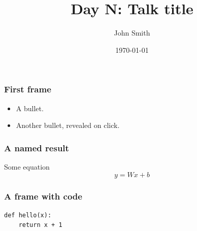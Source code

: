 %
\providecommand{\HANDOUT}{1}




\title[Day N: Talk title]
{Day N: Talk title}

\author[John Smith]
{John Smith}


\date[\today]
{\today}

\frame{\titlepage}

\begin{frame}
\frametitle{First frame}
\begin{itemize}
    \item A bullet.
    \pause
    \item Another bullet, revealed on click.
\end{itemize}
\end{frame}

\begin{frame}
\frametitle{A named result}
\begin{block}{Some equation}
    $$ y = Wx + b $$
\end{block}
\end{frame}

\begin{frame}[fragile]
\frametitle{A frame with code}
\begin{block}{}
\begin{lstlisting}
def hello(x):
    return x + 1
\end{lstlisting}
\end{block}
\end{frame}

